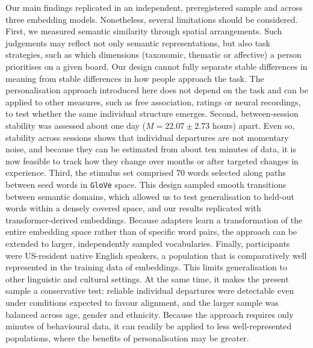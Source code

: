 \documentclass[pdflatex,sn-mathphys]{sn-jnl}
\begin{document}
Our main findings replicated in an independent, preregistered sample and across three embedding models. Nonetheless, several limitations should be considered. First, we measured semantic similarity through spatial arrangements. Such judgements may reflect not only semantic representations, but also task strategies, such as which dimensions (taxonomic, thematic or affective) a person prioritises on a given board\cite{Kallens2025,Kriegeskorte2012,Mirman2017}. Our design cannot fully separate stable differences in meaning from stable differences in how people approach the task. The personalisation approach introduced here does not depend on the task and can be applied to other measures, such as free association, ratings or neural recordings, to test whether the same individual structure emerges. Second, between-session stability was assessed about one day ($M = 22.07\pm2.73$ hours) apart. Even so, stability across sessions shows that individual departures are not momentary noise, and because they can be estimated from about ten minutes of data, it is now feasible to track how they change over months or after targeted changes in experience\cite{Binder2011,Meteyard2012}. Third, the stimulus set comprised 70 words selected along paths between seed words in \texttt{GloVe} space. This design sampled smooth transitions between semantic domains, which allowed us to test generalisation to held-out words within a densely covered space, and our results replicated with transformer-derived embeddings. Because adapters learn a transformation of the entire embedding space rather than of specific word pairs, the approach can be extended to larger, independently sampled vocabularies. Finally, participants were US-resident native English speakers, a population that is comparatively well represented in the training data of embeddings\cite{Atari2023,Paullada2021}. This limits generalisation to other linguistic and cultural settings. At the same time, it makes the present sample a conservative test: reliable individual departures were detectable even under conditions expected to favour alignment, and the larger sample was balanced across age, gender and ethnicity. Because the approach requires only minutes of behavioural data, it can readily be applied to less well-represented populations, where the benefits of personalisation may be greater.
\end{document}

